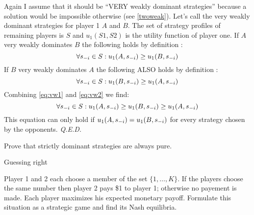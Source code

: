 \documentclass[../main.tex]{subfiles}
\begin{document}
\begin{solution}
	Again I assume that it should be ``VERY weakly dominant strategies'' because a solution would be impossible otherwise (see \autoref{twoweak}).
	Let's call the very weakly dominant strategies for player 1 $A$ and $B$.
	The set of strategy profiles of remaining players is $S$ and $u_1(S1,S2)$ is the utility function of player one.
	If $A$ very weakly dominates $B$ the following holds by definition :
	\begin{equation}
		\label{eq:vw1}
		\forall s_{\--i} \in S : u_1(A,s_{\--i}) \geq u_1(B,s_{\--i})
	\end{equation}
	If $B$ very weakly dominates $A$ the following ALSO holds by definition :
	\begin{equation}
		\label{eq:vw2}
		\forall s_{\--i} \in S : u_1(B,s_{\--i}) \geq u_1(A,s_{\--i})
	\end{equation}
	Combining \autoref{eq:vw1} and \autoref{eq:vw2} we find:
	\begin{equation}
		\forall s_{\--i} \in S : u_1(A,s_{\--i}) \geq u_1(B,s_{\--i}) \geq u_1(A,s_{\--i})
	\end{equation}
	This equation can only hold if $u_1(A,s_{\--i}) = u_1(B,s_{\--i})$ for every strategy chosen by the opponents. \textit{Q.E.D.}
\end{solution}

\begin{question}
	Prove that strictly dominant strategies are always pure. 
\end{question}

\begin{solution}

\end{solution}

\begin{question}
	Guessing right

	Player 1 and 2 each choose a member of the set $\{1,\ldots,K\}$. If the players choose the same number then player 2 pays \$1 to player 1; otherwise no payement is made. Each player maximizes his expected monetary payoff. Formulate this situation as a strategic game and find its Nash equilibria.
\end{question}

\begin{solution}

\end{solution}
\end{document}
